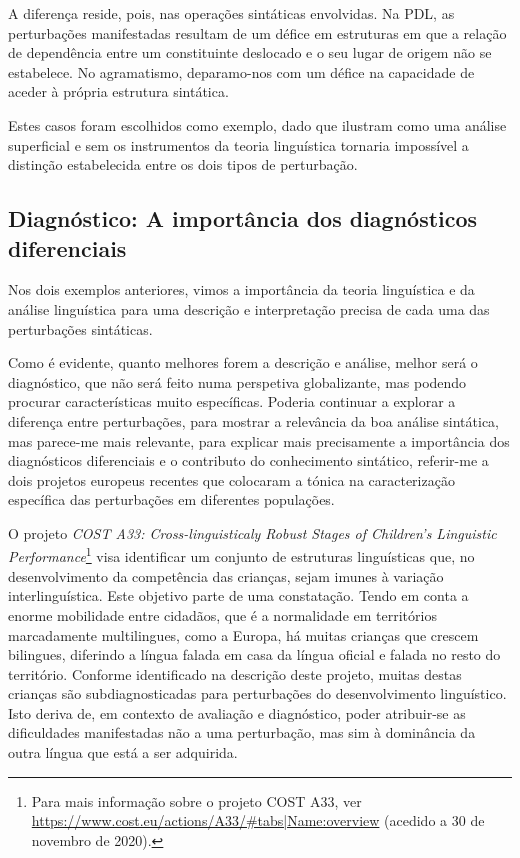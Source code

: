 \documentclass[output=paper,colorlinks,citecolor=brown,booklanguage=portuguese]{langscibook}
\begin{document}
A diferença reside, pois, nas operações sintáticas envolvidas. Na PDL, as perturbações manifestadas resultam de um défice em estruturas em que a relação de dependência entre um constituinte deslocado e o seu lugar de origem não se estabelece. No agramatismo, deparamo-nos com um défice na capacidade de aceder à própria estrutura sintática. 

\largerpage
Estes casos foram escolhidos como exemplo, dado que ilustram como uma análise superficial e sem os instrumentos da teoria linguística tornaria impossível a distinção estabelecida entre os dois tipos de perturbação.


\subsection{Diagnóstico: A importância dos diagnósticos diferenciais}

Nos dois exemplos anteriores, vimos a importância da teoria linguística e da análise linguística para uma descrição e interpretação precisa de cada uma das perturbações sintáticas.

Como é evidente, quanto melhores forem a descrição e análise, melhor será o diagnóstico, que não será feito numa perspetiva globalizante, mas podendo procurar características muito específicas. Poderia continuar a explorar a diferença entre perturbações, para mostrar a relevância da boa análise sintática, mas parece-me mais relevante, para explicar mais precisamente a importância dos diagnósticos diferenciais e o contributo do conhecimento sintático, referir-me a dois projetos europeus recentes que colocaram a tónica na caracterização específica das perturbações em diferentes populações.

O projeto \emph{COST A33: Cross-linguisticaly Robust Stages of Children’s Linguistic Performance}\footnote{Para mais informação sobre o projeto COST A33, ver \url{https://www.cost.eu/actions/A33/\#tabs|Name:overview} (acedido a 30 de novembro de 2020).} visa identificar um conjunto de estruturas linguísticas que, no desenvolvimento da competência das crianças, sejam imunes à variação interlinguística. Este objetivo parte de uma constatação. Tendo em conta a enorme mobilidade entre cidadãos, que é a normalidade em territórios marcadamente multilingues, como a Europa, há muitas crianças que crescem bilingues, diferindo a língua falada em casa da língua oficial e falada no resto do território. Conforme identificado na descrição deste projeto, muitas destas crianças são subdiagnosticadas para perturbações do desenvolvimento linguístico. Isto deriva de, em contexto de avaliação e diagnóstico, poder atribuir-se as dificuldades manifestadas não a uma perturbação, mas sim à dominância da outra língua que está a ser adquirida.
\end{document}
